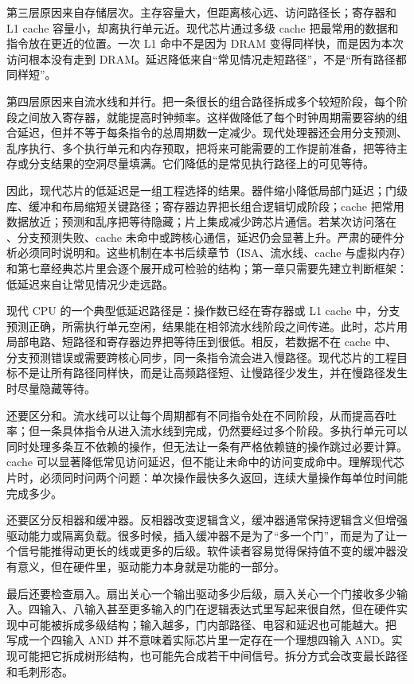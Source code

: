 第三层原因来自存储层次。主存容量大，但距离核心远、访问路径长；寄存器和 L1 cache 容量小，却离执行单元近。现代芯片通过多级 cache 把最常用的数据和指令放在更近的位置。一次 L1 命中不是因为 DRAM 变得同样快，而是因为本次访问根本没有走到 DRAM。延迟降低来自“常见情况走短路径”，不是“所有路径都同样短”。

第四层原因来自流水线和并行。把一条很长的组合路径拆成多个较短阶段，每个阶段之间放入寄存器，就能提高时钟频率。这样做降低了每个时钟周期需要容纳的组合延迟，但并不等于每条指令的总周期数一定减少。现代处理器还会用分支预测、乱序执行、多个执行单元和内存预取，把将来可能需要的工作提前准备，把等待主存或分支结果的空洞尽量填满。它们降低的是常见执行路径上的可见等待。

因此，现代芯片的低延迟是一组工程选择的结果。器件缩小降低局部门延迟；门级库、缓冲和布局缩短关键路径；寄存器边界把长组合逻辑切成阶段；cache 把常用数据放近；预测和乱序把等待隐藏；片上集成减少跨芯片通信。若某次访问落在 、分支预测失败、cache 未命中或跨核心通信，延迟仍会显著上升。严肃的硬件分析必须同时说明和。这些机制在本书后续章节（ISA、流水线、cache 与虚拟内存）和第七章经典芯片里会逐个展开成可检验的结构；第一章只需要先建立判断框架：低延迟来自让常见情况少走远路。

\begin{chipcase}
现代 CPU 的一个典型低延迟路径是：操作数已经在寄存器或 L1 cache 中，分支预测正确，所需执行单元空闲，结果能在相邻流水线阶段之间传递。此时，芯片用局部电路、短路径和寄存器边界把等待压到很低。相反，若数据不在 cache 中、分支预测错误或需要跨核心同步，同一条指令流会进入慢路径。现代芯片的工程目标不是让所有路径同样快，而是让高频路径短、让慢路径少发生，并在慢路径发生时尽量隐藏等待。
\end{chipcase}

还要区分和。流水线可以让每个周期都有不同指令处在不同阶段，从而提高吞吐率；但一条具体指令从进入流水线到完成，仍然要经过多个阶段。多执行单元可以同时处理多条互不依赖的操作，但无法让一条有严格依赖链的操作跳过必要计算。cache 可以显著降低常见访问延迟，但不能让未命中的访问变成命中。理解现代芯片时，必须同时问两个问题：单次操作最快多久返回，连续大量操作每单位时间能完成多少。

还要区分反相器和缓冲器。反相器改变逻辑含义，缓冲器通常保持逻辑含义但增强驱动能力或隔离负载。很多时候，插入缓冲器不是为了“多一个门”，而是为了让一个信号能推得动更长的线或更多的后级。软件读者容易觉得保持值不变的缓冲器没有意义，但在硬件里，驱动能力本身就是功能的一部分。

最后还要检查扇入。扇出关心一个输出驱动多少后级，扇入关心一个门接收多少输入。四输入、八输入甚至更多输入的门在逻辑表达式里写起来很自然，但在硬件实现中可能被拆成多级结构；输入越多，门内部路径、电容和延迟也可能越大。把  写成一个四输入 AND 并不意味着实际芯片里一定存在一个理想四输入 AND。实现可能把它拆成树形结构，也可能先合成若干中间信号。拆分方式会改变最长路径和毛刺形态。

